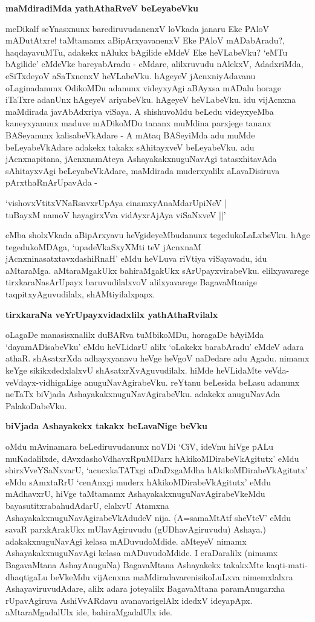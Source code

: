 \noindent
\textbf{maMdiradiMda yathAthaRveV beLeyabeVku}\label{page69}

meDikalf seYnasxnunx barediruvudanenxV loVkada janaru Eke PAloV mADutAtxre! taMtamamx aBipArxyavanenxV Eke PAloV mADabAradu?, haqdayavuMTu, adakekx nAlukx bAgilide eMdeV Eke heVLabeVku? `eMTu bAgilide' eMdeVke bareyabAradu - eMdare, alilxruvudu nAlekxV, AdadxriMda, eSiTxdeyoV aSaTxnenxV heVLabeVku. hAgeyeV jAcnxniyAdavanu oLaginadanunx OdikoMDu adanunx videyxyAgi aBAyxsa mADalu horage iTaTxre adanUnx hAgeyeV ariyabeVku. hAgeyeV heVLabeVku. idu vijAcnxna maMdirada javAbAdxriya viSaya. A shishuvoMdu beLedu videyxyeMba kaneyxyanunx maduve mADikoMDu tananx muMdina parxjege tananx BASeyanunx kalisabeVkAdare - A mAtaq BASeyiMda adu muMde beLeyabeVkAdare adakekx takakx sAhitayxveV beLeyabeVku. adu jAcnxnapitana, jAcnxnamAteya AshayakakxnuguNavAgi tatasxhitavAda sAhitayxvAgi beLeyabeVkAdare, maMdirada muderxyalilx aLavaDisiruva pArxthaRnArUpavAda -

\begin{shloka}
`vishovxVtitxVNaRsavxrUpAya cinamxyAnaMdarUpiNeV |\\\label{69}
tuBayxM namoV hayagirxVva vidAyxrAjAya viSaNxveV ||'
\end{shloka}

eMba sholxVkada aBipArxyavu heVgideyeMbudanunx tegedukoLaLxbeVku. hAge tegedukoMDAga, `upadeVkaSxyXMti teV jAcnxnaM\label{69} jAcnxninasatxtavxdashiRnaH' eMdu heVLuva riVtiya viSayavadu, idu aMtaraMga. aMtaraMgakUkx bahiraMgakUkx sArUpayxvirabeVku. elilxyavarege tirxkaraNasArUpayx baruvudilalxvoV alilxyavarege BagavaMtanige taqpitxyAguvudilalx, shAMtiyilalxpapx.

\noindent
\textbf{tirxkaraNa veYrUpayxvidadxlilx yathAthaRvilalx}\label{page69}

oLagaDe manasisxnalilx duBARva tuMbikoMDu, horagaDe bAyiMda `dayamADisabeVku' eMdu heVLidarU alilx `oLakekx barabAradu' eMdeV adara athaR. shAsatxrXda adhayxyanavu heVge heVgoV naDedare adu Agadu. nimamx keYge sikikxdedxlalxvU shAsatxrXvAguvudilalx. hiMde heVLidaMte veVda-veVdayx-vidhigaLige anuguNavAgirabeVku. reYtanu beLesida beLasu adanunx neTaTx biVjada AshayakakxnuguNavAgirabeVku. adakekx anuguNavAda PalakoDabeVku.

\noindent
\textbf{biVjada Ashayakekx takakx beLavaNige beVku}\label{page70}

oMdu mAvinamara beLediruvudanunx noVDi `CiV, ideVnu hiVge pALu muKadalilxde, dAvxdashoVdhavxRpuMDarx hAkikoMDirabeVkAgitutx' eMdu shirxVveYSaNxvarU, `acucxkaTATxgi aDaDxgaMdha hAkikoMDirabeVkAgitutx' eMdu sAmxtaRrU `cenAnxgi muderx hAkikoMDirabeVkAgitutx' eMdu mAdhavxrU, hiVge taMtamamx AshayakakxnuguNavAgirabeVkeMdu bayasutitxrabahudAdarU, elalxvU Atamxna AshayakakxnuguNavAgirabeVkAdudeV nija. (A=samaMtAtf sheVteV' eMdu savaR parxkArakUkx mUlavAgiruvudu (gUDhavAgiruvudu) Ashaya.) adakakxnuguNavAgi kelasa mADuvudoMdide. aMteyeV nimamx AshayakakxnuguNavAgi kelasa mADuvudoMdide. I eraDaralilx (nimamx BagavaMtana AshayAnuguNa) BagavaMtana Ashayakekx takakxMte kaqti-mati-dhaqtigaLu beVkeMdu vijAcnxna maMdiradavarenisikoLuLxva nimemxlalxra AshayaviruvudAdare, alilx adara joteyalilx BagavaMtana paramAnugarxha rUpavAgiruva AshiVvARdavu avanavarigelAlx idedxV ideyapApx. aMtaraMgadalUlx ide, bahiraMgadalUlx ide. 

